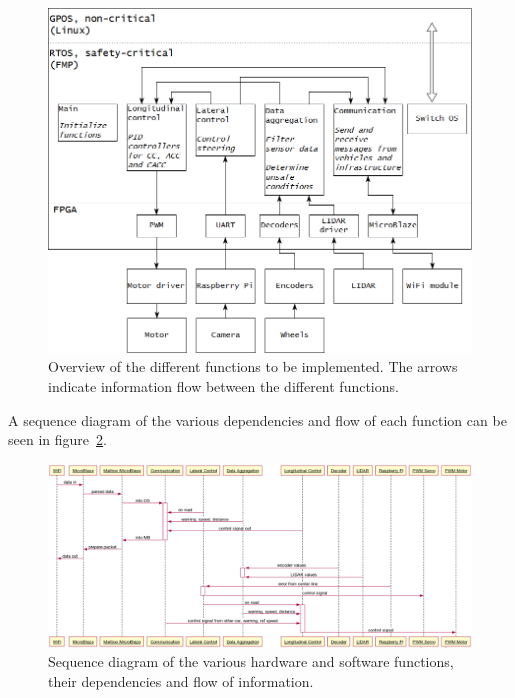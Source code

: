 \begin{figure}[H]
\centering
\includegraphics[width=\textwidth]{./img/design_overview.png}
\caption{Overview of the different functions to be implemented. The arrows indicate information flow between the different functions.}\label{fig:overview}
\end{figure}

A sequence diagram of the various dependencies and flow of each function can be seen in figure~\ref{fig:sequence}.

\begin{figure}[H]
\centering
\includegraphics[width=\textwidth]{./img/design_sequence3.png}
\caption{Sequence diagram of the various hardware and software functions, their dependencies and flow of information.}\label{fig:sequence}
\end{figure}
